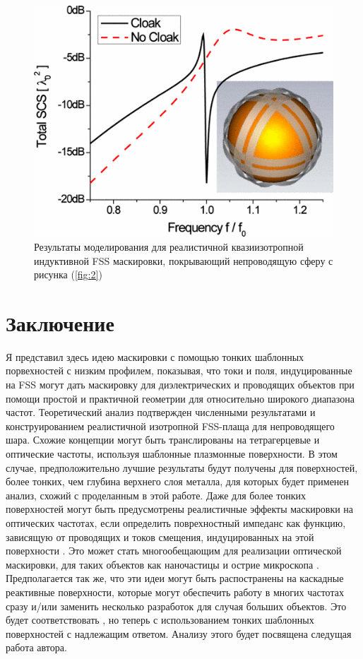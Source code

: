 \documentclass[12pt,a4paper]{article}
\begin{document}
\begin{figure}[t]
  \centering
  \includegraphics[height=0.2\paperheight, width=0.4\paperwidth]{6.png}
  \caption{Результаты моделирования для реалистичной квазиизотропной индуктивной FSS 
  маскировки, покрывающий непроводящую сферу с рисунка (\ref{fig:2})}
  \label{fig:6}
\end{figure}

\section{Заключение}
Я представил здесь идею маскировки с помощью тонких шаблонных порвехностей с низким профилем,
показывая, что токи и поля, индуцированные на FSS могут дать маскировку для диэлектрических
и проводящих объектов при помощи простой и практичной геометрии для относительно широкого
диапазона частот. Теоретический анализ подтвержден численными результатами и конструированием
реалистичной изотропной FSS-плаща для непроводящего шара. Схожие концепции могут быть 
транслированы на тетрагерцевые и оптические частоты, используя шаблонные плазмонные 
поверхности. В этом случае, предположительно лучшие результаты будут получены для 
поверхностей, более тонких, чем глубина верхнего слоя металла, для которых будет применен
анализ, схожий с проделанным в этой работе. Даже для более тонких поверхностей могут 
быть предусмотрены реалистичные эффекты маскировки на оптических частотах, если определить
поврехностный импеданс как функцию, зависящую от проводящих и токов смещения, индуцированных
на этой поверхности \cite{18}. Это может стать многообещающим для реализации оптической 
маскировки, для таких объектов как наночастицы и острие микроскопа \cite{16,17}. 
Предполагается так же, что эти идеи могут быть распостранены на каскадные реактивные 
поверхности, которые могут обеспечить работу в многих частотах сразу и/или заменить несколько
разработок для случая больших объектов. Это будет соответствовать \cite{9}, но теперь с 
использованием тонких шаблонных поверхностей с надлежащим ответом. Анализу этого будет
посвящена следущая работа автора.
\end{document}
